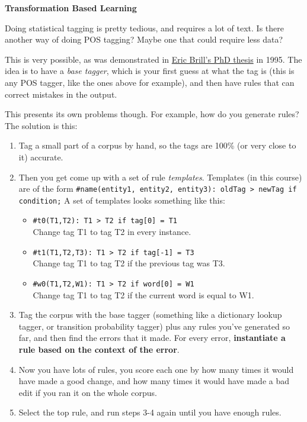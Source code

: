 \begin{description}
  \item \textbf{Transformation Based Learning}\\
  \label{brill-rules}


  Doing statistical tagging is pretty tedious, and requires a lot of text. Is
  there another way of doing POS tagging? Maybe one that could require less
  data?

  This is very possible, as was demonstrated in
  \href{http://dl.acm.org/citation.cfm?doid=974499.974526}{Eric Brill's PhD
  thesis} in 1995. The idea is to have a \textit{base tagger}, which is your 
  first guess at what the tag is (this is any POS tagger, like the ones above 
  for example), and then have rules that can correct mistakes in the output.

  This presents its own problems though. For example, how do you generate 
  rules? The solution is this:

  \begin{enumerate}
    \item Tag a small part of a corpus by hand, so the tags are 100\% (or very 
    close to it) accurate.
    \item Then you get come up with a set of rule \textit{templates}. Templates 
    (in this course) are of the form
    \texttt{\#name(entity1, entity2, entity3): oldTag > newTag if condition;} A 
    set of templates looks something like this:
    \begin{itemize}
      \item \texttt{\#t0(T1,T2): T1 > T2 if tag[0] = T1}\\
        Change tag T1 to tag T2 in every instance.
      \item \texttt{\#t1(T1,T2,T3): T1 > T2 if tag[-1] = T3}\\
        Change tag T1 to tag T2 if the previous tag was T3.
      \item \texttt{\#w0(T1,T2,W1): T1 > T2 if word[0] = W1}\\
        Change tag T1 to tag T2 if the current word is equal to W1.
    \end{itemize}
    \item Tag the corpus with the base tagger (something like a dictionary 
    lookup tagger, or transition probability tagger) plus any rules you've 
    generated so far, and then find the errors that it made. For every error,
    \textbf{instantiate a rule based on the context of the error}.
    \item Now you have lots of rules, you score each one by how many times it 
    would have made a good change, and how many times it would have made a bad 
    edit if you ran it on the whole corpus.
    \item Select the top rule, and run steps 3-4 again until you have enough 
    rules.
  \end{enumerate}


\end{description}
